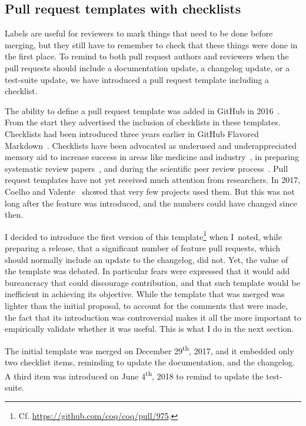 \subsection{Pull request templates with checklists}

\label{sec:template}

Labels are useful for reviewers to mark things that need to be done before merging, but they still have to remember to check that these things were done in the first place.
To remind to both pull request authors and reviewers when the pull requests should include a documentation update, a changelog update, or a test-suite update, we have introduced a pull request template including a checklist.

The ability to define a pull request template was added in GitHub in 2016~\cite{github_issue_template}.
From the start they advertised the inclusion of checklists in these templates.
Checklists had been introduced three years earlier in GitHub Flavored Markdown~\cite{github_checklists}.
Checklists have been advocated as underused and underappreciated memory aid to increase success in areas like medicine and industry~\cite{gawande2010checklist}, in preparing systematic review papers~\cite{oxman1994systematic}, and during the scientific peer review process~\cite{parker2018empowering}.
Pull request templates have not yet received much attention from researchers.
In 2017, Coelho and Valente~\cite{coelho2017modern} showed that very few projects used them.
But this was not long after the feature was introduced, and the numbers could have changed since then.

I decided to introduce the first version of this template\footnote{
	Cf. \url{https://github.com/coq/coq/pull/975}.
} when I noted, while preparing a release, that a significant number of feature pull requests, which should normally include an update to the changelog, did not.
Yet, the value of the template was debated. In particular fears were expressed that it would add bureaucracy that could discourage contribution, and that such template would be inefficient in achieving its objective.
While the template that was merged was lighter than the initial proposal, to account for the comments that were made, the fact that its introduction was controversial makes it all the more important to empirically validate whether it was useful.
This is what I do in the next section.

The initial template was merged on December 29\textsuperscript{th}, 2017, and it embedded only two checklist items, reminding to update the documentation, and the changelog.
A third item was introduced on June 4\textsuperscript{th}, 2018 to remind to update the test-suite.

